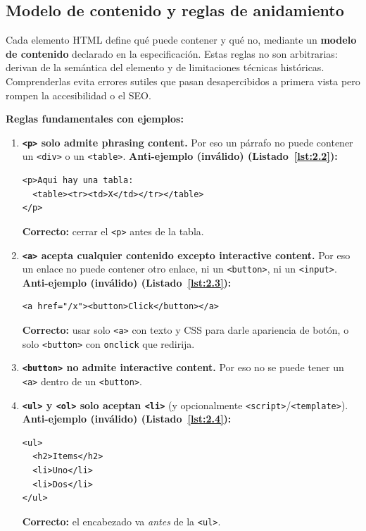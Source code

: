 \subsection{Modelo de contenido y reglas de anidamiento}

Cada elemento HTML define qué puede contener y qué no, mediante un
\textbf{modelo de contenido} declarado en la especificación. Estas
reglas no son arbitrarias: derivan de la semántica del elemento y de
limitaciones técnicas históricas. Comprenderlas evita errores
sutiles que pasan desapercibidos a primera vista pero rompen la
accesibilidad o el SEO.

\textbf{Reglas fundamentales con ejemplos:}

\begin{enumerate}
\item \textbf{\texttt{<p>} solo admite phrasing content.} Por eso un
párrafo no puede contener un \texttt{<div>} o un \texttt{<table>}.
\textbf{Anti-ejemplo (inválido) (Listado~\ref{lst:2.2}):}
\begin{lstlisting}[style=html,numbers=none,caption={Ejemplo de HTML},label=lst:2.2]
<p>Aqui hay una tabla:
  <table><tr><td>X</td></tr></table>
</p>
\end{lstlisting}
\textbf{Correcto:} cerrar el \texttt{<p>} antes de la tabla.

\item \textbf{\texttt{<a>} acepta cualquier contenido excepto
interactive content.} Por eso un enlace no puede contener otro
enlace, ni un \texttt{<button>}, ni un \texttt{<input>}.
\textbf{Anti-ejemplo (inválido) (Listado~\ref{lst:2.3}):}
\begin{lstlisting}[style=html,numbers=none,caption={Ejemplo de HTML},label=lst:2.3]
<a href="/x"><button>Click</button></a>
\end{lstlisting}
\textbf{Correcto:} usar solo \texttt{<a>} con texto y CSS para
darle apariencia de botón, o solo \texttt{<button>} con
\texttt{onclick} que redirija.

\item \textbf{\texttt{<button>} no admite interactive content.} Por
eso no se puede tener un \texttt{<a>} dentro de un \texttt{<button>}.

\item \textbf{\texttt{<ul>} y \texttt{<ol>} solo aceptan
\texttt{<li>}} (y opcionalmente \texttt{<script>}/\texttt{<template>}).
\textbf{Anti-ejemplo (inválido) (Listado~\ref{lst:2.4}):}
\begin{lstlisting}[style=html,numbers=none,caption={Ejemplo de HTML},label=lst:2.4]
<ul>
  <h2>Items</h2>
  <li>Uno</li>
  <li>Dos</li>
</ul>
\end{lstlisting}
\textbf{Correcto:} el encabezado va \emph{antes} de la \texttt{<ul>}.


\end{enumerate}
